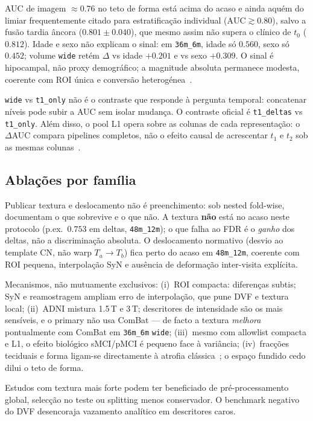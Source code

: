 \documentclass[review]{elsarticle}
\newcommand{\code}[1]{\texttt{#1}}
\begin{document}
AUC de imagem $\approx 0.76$ no teto de forma está acima do acaso e ainda aquém do limiar frequentemente citado para estratificação individual ($\mathrm{AUC}\gtrsim 0.80$), salvo a fusão tardia âncora ($0.801\pm0.040$), que mesmo assim não supera o clínico de $t_0$ ($0.812$).
Idade e sexo não explicam o sinal: em \code{36m\_6m}, idade só $0.560$, sexo só $0.452$; volume \code{wide} retém $\Delta$ vs idade $+0.201$ e vs sexo $+0.309$.
O sinal é hipocampal, não proxy demográfico; a magnitude absoluta permanece modesta, coerente com ROI única e conversão heterogénea~\cite{wyman-2013,scheltens-1992,cuingnet-2011}.

\code{wide} vs \code{t1\_only} não é o contraste que responde à pergunta temporal: concatenar níveis pode subir a AUC sem isolar mudança.
O contraste oficial é \code{t1\_deltas} vs \code{t1\_only}.
Além disso, o pool L1 opera sobre as colunas de cada representação: o $\Delta$AUC compara pipelines completos, não o efeito causal de acrescentar $t_1$ e $t_2$ sob as mesmas colunas~\cite{meinshausen-2010}.

\subsection{Ablações por família}

Publicar textura e deslocamento não é preenchimento: sob nested fold-wise, documentam o que sobrevive e o que não.
A textura \textbf{não} está no acaso neste protocolo (p.ex.\ $0.753$ em deltas, \code{48m\_12m}); o que falha ao FDR é o \emph{ganho} dos deltas, não a discriminação absoluta.
O deslocamento normativo (desvio ao template CN, não warp $T_a\to T_b$) fica perto do acaso em \code{48m\_12m}, coerente com ROI pequena, interpolação SyN e ausência de deformação inter-visita explícita.

Mecanismos, não mutuamente exclusivos:
(i)~ROI compacta: diferenças subtis; SyN e reamostragem ampliam erro de interpolação, que pune DVF e textura local;
(ii)~ADNI mistura 1.5\,T e 3\,T; descritores de intensidade são os mais sensíveis, e o primary não usa ComBat --- de facto a textura \emph{melhora} pontualmente com ComBat em \code{36m\_6m} \code{wide};
(iii)~mesmo com allowlist compacta e L1, o efeito biológico sMCI/pMCI é pequeno face à variância;
(iv)~fracções teciduais e forma ligam-se directamente à atrofia clássica~\cite{wyman-2013}; o espaço fundido cedo dilui o teto de forma.

Estudos com textura mais forte podem ter beneficiado de pré-processamento global, selecção no teste ou splitting menos conservador.
O benchmark negativo do DVF desencoraja vazamento analítico em descritores caros.
\end{document}
